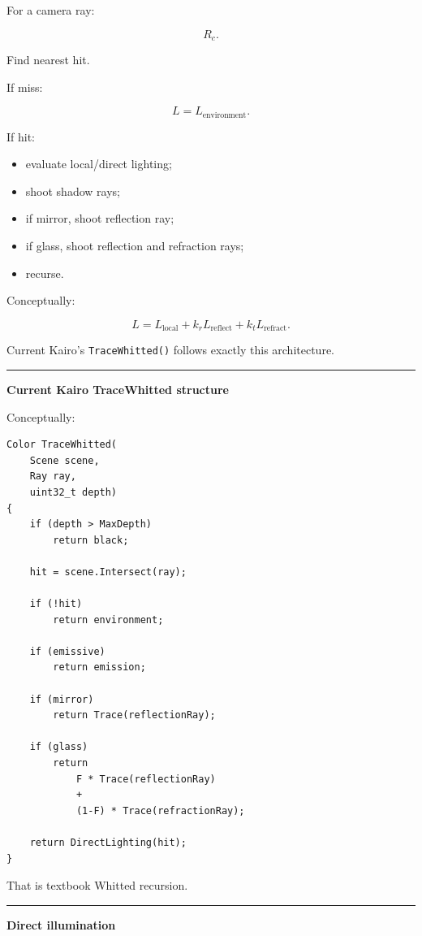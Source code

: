 For a camera ray:

\[
R_c.
\]

Find nearest hit.

If miss:

\[
L=L_{\text{environment}}.
\]

If hit:

\begin{itemize}
\tightlist
\item
  evaluate local/direct lighting;
\item
  shoot shadow rays;
\item
  if mirror, shoot reflection ray;
\item
  if glass, shoot reflection and refraction rays;
\item
  recurse.
\end{itemize}

Conceptually:

\[
\boxed{
L=
L_{\text{local}}
+
k_rL_{\text{reflect}}
+
k_tL_{\text{refract}}.
}
\]

Current Kairo's \texttt{TraceWhitted()} follows exactly this architecture.

\begin{center}\rule{0.5\linewidth}{0.5pt}\end{center}

\textbf{Current Kairo TraceWhitted structure}

Conceptually:

\begin{verbatim}
Color TraceWhitted(
    Scene scene,
    Ray ray,
    uint32_t depth)
{
    if (depth > MaxDepth)
        return black;

    hit = scene.Intersect(ray);

    if (!hit)
        return environment;

    if (emissive)
        return emission;

    if (mirror)
        return Trace(reflectionRay);

    if (glass)
        return
            F * Trace(reflectionRay)
            +
            (1-F) * Trace(refractionRay);

    return DirectLighting(hit);
}
\end{verbatim}

That is textbook Whitted recursion.

\begin{center}\rule{0.5\linewidth}{0.5pt}\end{center}

\textbf{Direct illumination}

